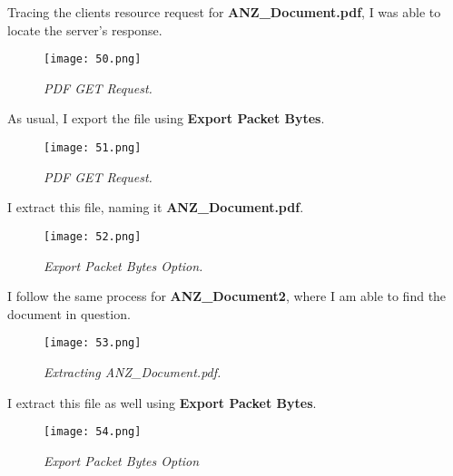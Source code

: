 Tracing the clients resource request for \textbf{ANZ\_Document.pdf}, I was able to locate the server's response. 

\begin{figure}[H]
    \setlength{\abovecaptionskip}{20pt}
    \setlength{\belowcaptionskip}{0pt}
    \centering
    \texttt{[image: 50.png]}
    \captionsetup{justification=centering}
    \caption{\textit{PDF GET Request.}}
    \label{fig:50}
\end{figure}
\vspace{-10pt}

As usual, I export the file using \textbf{Export Packet Bytes}.

\begin{figure}[H]
    \setlength{\abovecaptionskip}{20pt}
    \setlength{\belowcaptionskip}{0pt}
    \centering
    \texttt{[image: 51.png]}
    \captionsetup{justification=centering}
    \caption{\textit{PDF GET Request.}}
    \label{fig:51}
\end{figure}
\vspace{-10pt}

I extract this file, naming it \textbf{ANZ\_Document.pdf}.

\begin{figure}[H]
    \setlength{\abovecaptionskip}{20pt}
    \setlength{\belowcaptionskip}{0pt}
    \centering
    \texttt{[image: 52.png]}
    \captionsetup{justification=centering}
    \caption{\textit{Export Packet Bytes Option.}}
    \label{fig:52}
\end{figure}
\vspace{-10pt}

I follow the same process for \textbf{ANZ\_Document2}, where I am able to find the document in question.

\begin{figure}[H]
    \setlength{\abovecaptionskip}{20pt}
    \setlength{\belowcaptionskip}{0pt}
    \centering
    \texttt{[image: 53.png]}
    \captionsetup{justification=centering}
    \caption{\textit{Extracting ANZ\_Document.pdf.}}
    \label{fig:53}
\end{figure}
\vspace{-10pt}

I extract this file as well using \textbf{Export Packet Bytes}.

\begin{figure}[H]
    \setlength{\abovecaptionskip}{20pt}
    \setlength{\belowcaptionskip}{0pt}
    \centering
    \texttt{[image: 54.png]}
    \captionsetup{justification=centering}
    \caption{\textit{Export Packet Bytes Option}}
    \label{fig:54}
\end{figure}
\vspace{-10pt}

